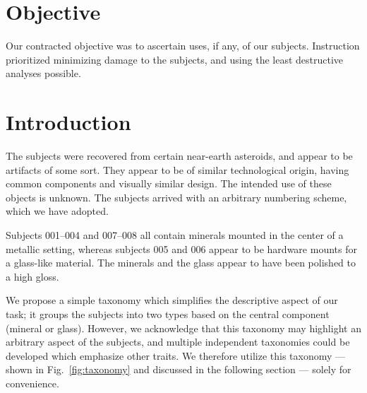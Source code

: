 \documentclass[10pt]{article}
\theoremstyle{definition}
\begin{document}
\maketitle


\section{Objective}
Our contracted objective was to ascertain uses, if any, of our subjects.
Instruction prioritized minimizing damage to the subjects, and using the least destructive analyses possible.

\section{Introduction}
The subjects were recovered from certain near-earth asteroids, and appear to be artifacts of some sort.
They appear to be of similar technological origin, having common components and visually similar design.
The intended use of these objects is unknown.
The subjects arrived with an arbitrary numbering scheme, which we have adopted.

Subjects 001--004 and 007--008 all contain minerals mounted in the center of a metallic setting, whereas subjects 005 and 006 appear to be hardware mounts for a glass-like material.
The minerals and the glass appear to have been polished to a high gloss.

We propose a simple taxonomy which simplifies the descriptive aspect of our task; it groups the subjects into two types based on the central component (mineral or glass).
However, we acknowledge that this taxonomy may highlight an arbitrary aspect of the subjects, and multiple independent taxonomies could be developed which emphasize other traits.
We therefore utilize this taxonomy --- shown in Fig.~\ref{fig:taxonomy} and discussed in the following section --- solely for convenience.
\end{document}
